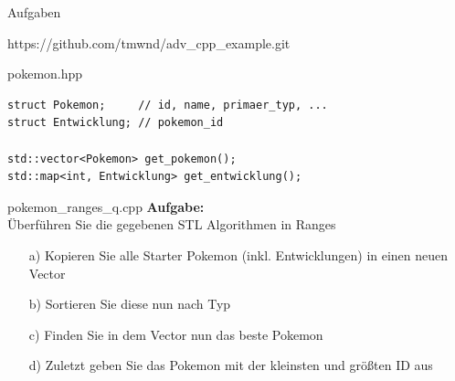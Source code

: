 \begin{frame}{Aufgaben}
    \begin{center}
        https://github.com/tmwnd/adv\_cpp\_example.git
    \end{center}
\end{frame}

\begin{frame}[fragile]{pokemon.hpp}
    \begin{verbatim}
struct Pokemon;     // id, name, primaer_typ, ...
struct Entwicklung; // pokemon_id

std::vector<Pokemon> get_pokemon();
std::map<int, Entwicklung> get_entwicklung();
    \end{verbatim}
\end{frame}



\begin{frame}{pokemon\_ranges\_q.cpp}
    \textbf{Aufgabe:}\\
    Überführen Sie die gegebenen STL Algorithmen in Ranges

    \begin{enumerate} %
        \item[a)] Kopieren Sie alle Starter Pokemon (inkl. Entwicklungen) in einen neuen Vector
        \item[b)] Sortieren Sie diese nun nach Typ
        \item[c)] Finden Sie in dem Vector nun das beste Pokemon
        \item[d)] Zuletzt geben Sie das Pokemon mit der kleinsten und größten ID aus
    \end{enumerate}
\end{frame}

